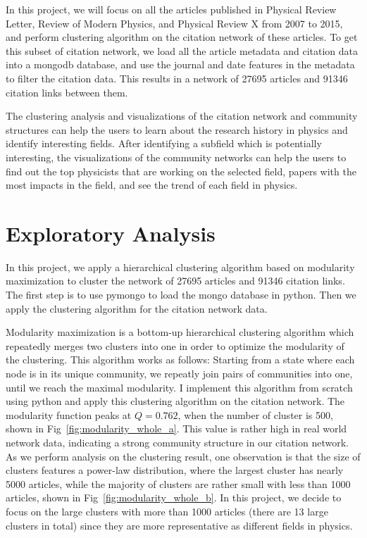 \documentclass{article} %
\begin{document}
In this project, we will focus on all the articles published in Physical Review Letter, Review of Modern Physics, and Physical Review X from 2007 to 2015, and perform clustering algorithm on the citation network of these articles. To get this subset of citation network, we load all the article metadata and citation data into a mongodb database, and use the journal and date features in the metadata to filter the citation data. This results in a network of 27695 articles and 91346 citation links between them.

The clustering analysis and visualizations of the citation network and community structures can help the users to learn about the research history in physics and identify interesting fields. After identifying a subfield which is potentially interesting, the visualizations of the community networks can help the users to find out the top physicists that are working on the selected field, papers with the most impacts in the field, and see the trend of each field in physics.

\section{Exploratory Analysis}

In this project, we apply a hierarchical clustering algorithm based on modularity maximization to cluster the network of 27695 articles and 91346 citation links. The first step is to use pymongo to load the mongo database in python. Then we apply the clustering algorithm for the citation network data.

Modularity maximization is a bottom-up hierarchical clustering algorithm which repeatedly merges two clusters into one in order to optimize the modularity of the clustering. This algorithm works as follows: Starting from a state where each node is in its unique community, we repeatly join pairs of communities into one, until we reach the maximal modularity. I implement this algorithm from scratch using python and apply this clustering algorithm on the citation network. The modularity function peaks at $Q = 0.762$, when the number of cluster is 500, shown in Fig~\ref{fig:modularity_whole_a}. This value is rather high in real world network data, indicating a strong community structure in our citation network. 
As we perform analysis on the clustering result, one observation is that the size of clusters features a power-law distribution, where the largest cluster has nearly 5000 articles, while the majority of clusters are rather small with less than 1000 articles, shown in Fig~\ref{fig:modularity_whole_b}. In this project, we decide to focus on the large clusters with more than 1000 articles (there are 13 large clusters in total) since they are more representative as different fields in physics. 
\end{document}
